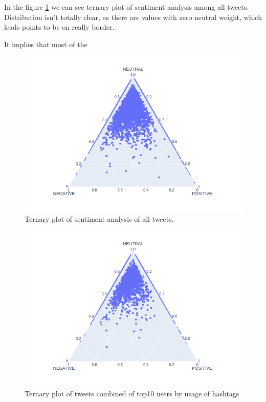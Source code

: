 \documentclass[conference]{IEEEtran}
\begin{document}
In the figure \ref{fig:sentiment-ternary-all} we can see ternary plot of sentiment analysis among all tweets.
Distribution isn't totally clear, as there are values with zero neutral weight, which leads points to be on really border.

It implies that most of the

\begin{figure}
\includegraphics[scale=0.4]{figures/sentiment_ternary_all}
\caption{Ternary plot of sentiment analysis of all tweets.}
\label{fig:sentiment-ternary-all}
\end{figure}

\begin{figure}
\includegraphics[scale=0.4]{figures/sentiment_ternary_amount_hashtags}
\caption{Ternary plot of tweets combined of top10 users by usage of hashtags }
\label{fig:sentiment-ternary-user-hashtag}
\end{figure}
\end{document}
